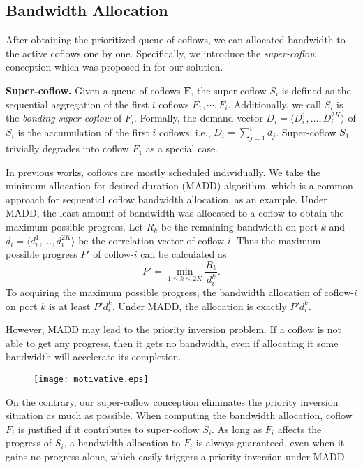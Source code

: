 \documentclass[10pt, conference, letterpaper]{IEEEtran}
\begin{document}
\subsection{Bandwidth Allocation}
After obtaining the prioritized queue of coflows, we can allocated bandwidth to the active coflows one by one. Specifically, we introduce the \emph{super-coflow} conception which was proposed in \cite{utopia} for our solution.

\noindent \textbf{Super-coflow.} Given a queue of coflows $\mathbf{F}$, the super-coflow $S_i$ is defined as the sequential aggregation of the first $i$ coflows $F_1,\cdots,F_i$. Additionally, we call $S_i$ is the \emph{bonding super-coflow} of $F_i$. Formally, the demand vector $D_i = \langle D_i^1,\dots,D_i^{2K} \rangle$ of $S_i$ is the accumulation of the first $i$ coflows, i.e., $D_i = \sum_{j=1}^id_j$. Super-coflow $S_1$ trivially degrades into coflow $F_1$ as a special case.

In previous works, coflows are mostly scheduled individually. We take the minimum-allocation-for-desired-duration (MADD) algorithm, which is a common approach for sequential coflow bandwidth allocation, as an example\cite{varys, orchestra}. Under MADD, the least amount of bandwidth was allocated to a coflow to obtain the maximum possible progress. Let $R_k$ be the remaining bandwidth on port $k$ and $d_i=\langle d_i^1,\dots,d_i^{2K}\rangle$ be the correlation vector of coflow-$i$. Thus the maximum possible progress $P'$ of coflow-$i$ can be calculated as
\begin{equation}
	P' = \min_{1\leq k \leq 2K}\frac{R_k}{d_i^k}.
\end{equation}
To acquiring the maximum possible progress, the bandwidth allocation of coflow-$i$ on port $k$ is at least $P'd_i^k$. Under MADD, the allocation is exactly $P'd_i^k$. 

However, MADD may lead to the priority inversion problem. If a coflow is not able to get any progress, then it gets no bandwidth, even if allocating it some bandwidth will accelerate its completion.

\begin{figure}
	\centering\texttt{[image: motivative.eps]}
	\caption{}\label{motivative}
\end{figure}


On the contrary, our super-coflow conception eliminates the priority inversion situation as much as possible. When computing the bandwidth allocation, coflow $F_i$ is justified if it contributes to super-coflow $S_i$. As long as $F_i$ affects the progress of $S_i$, a bandwidth allocation to $F_i$ is always guaranteed, even when it gains no progress alone, which easily triggers a priority inversion under MADD.
\end{document}
